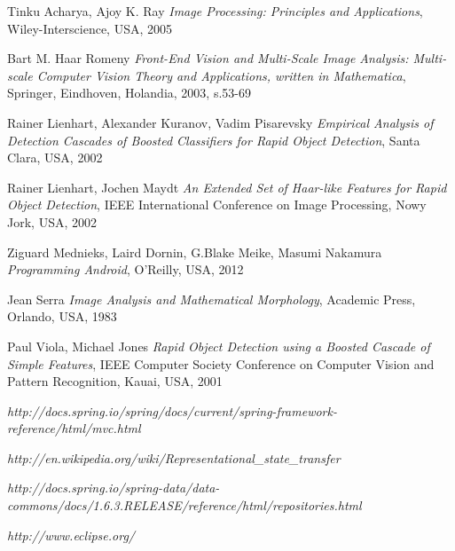\begin{thebibliography}{99}
   	Tinku Acharya, Ajoy K. Ray
   	\emph{Image Processing: Principles and Applications},
	Wiley-Interscience, USA, 2005
	
   
	Bart M. Haar Romeny
	\emph{Front-End Vision and Multi-Scale Image Analysis: Multi-scale Computer Vision Theory and Applications, written in Mathematica},
	Springer,
	Eindhoven, Holandia, 2003,
	s.53-69

	Rainer Lienhart, Alexander Kuranov, Vadim Pisarevsky
	\emph{Empirical Analysis of Detection Cascades of Boosted Classifiers for Rapid Object 
Detection},
	Santa Clara, USA, 2002	
		
	Rainer Lienhart, Jochen Maydt
	\emph{An Extended Set of Haar-like Features for Rapid Object Detection},
	IEEE International Conference on Image Processing, Nowy Jork, USA, 2002
	
	Ziguard Mednieks, Laird Dornin, G.Blake Meike, Masumi Nakamura 
   	\emph{Programming Android}, O'Reilly,
    USA, 2012

	Jean Serra
	\emph{Image Analysis and Mathematical Morphology},
	Academic Press, Orlando, USA, 1983
	
	Paul Viola, Michael Jones
	\emph{Rapid Object Detection using a Boosted Cascade of Simple Features},
	IEEE Computer Society Conference on Computer Vision and Pattern Recognition, Kauai, USA, 2001

	\emph{http://docs.spring.io/spring/docs/current/spring-framework-reference/html/mvc.html}
	
	\emph{http://en.wikipedia.org/wiki/Representational_state_transfer}	
	
	\emph{http://docs.spring.io/spring-data/data-commons/docs/1.6.3.RELEASE/reference/html/repositories.html}
	
	\emph{http://www.eclipse.org/}	



\end{thebibliography}

